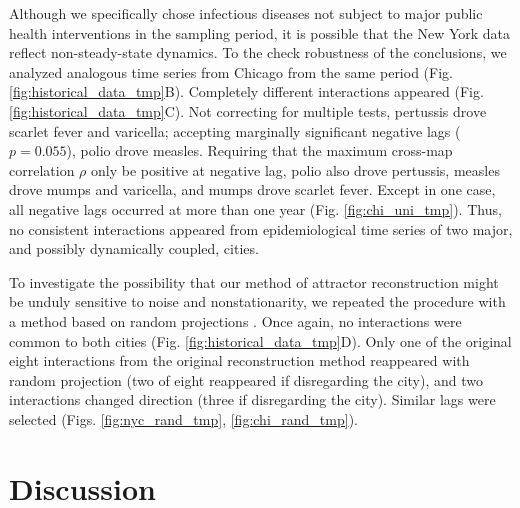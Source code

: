 \documentclass[10pt]{article}
\begin{document}
Although we specifically chose infectious diseases not subject to major public health interventions in the sampling period, it is possible that the New York data reflect non-steady-state dynamics.
To the check robustness of the conclusions, we analyzed analogous time series from Chicago from the same period (Fig. \ref{fig:historical_data_tmp}B).
Completely different interactions appeared (Fig. \ref{fig:historical_data_tmp}C).
Not correcting for multiple tests, pertussis drove scarlet fever and varicella; accepting marginally significant negative lags ($p=0.055$), polio drove measles.
Requiring that the maximum cross-map correlation $\rho$ only be positive at negative lag, polio also drove pertussis, measles drove mumps and varicella, and mumps drove scarlet fever.
Except in one case, all negative lags occurred at more than one year (Fig. \ref{fig:chi_uni_tmp}).
Thus, no consistent interactions appeared from epidemiological time series of two major, and possibly dynamically coupled, cities.

To investigate the possibility that our method of attractor reconstruction might be unduly sensitive to noise and nonstationarity, we repeated the procedure with a method based on random projections \cite{Tajima2015}.
Once again, no interactions were common to both cities (Fig. \ref{fig:historical_data_tmp}D).
Only one of the original eight interactions from the original reconstruction method reappeared with random projection (two of eight reappeared if disregarding the city), and two interactions changed direction (three if disregarding the city). 
Similar lags were selected (Figs. \ref{fig:nyc_rand_tmp}, \ref{fig:chi_rand_tmp}).

\section{Discussion}
\end{document}
